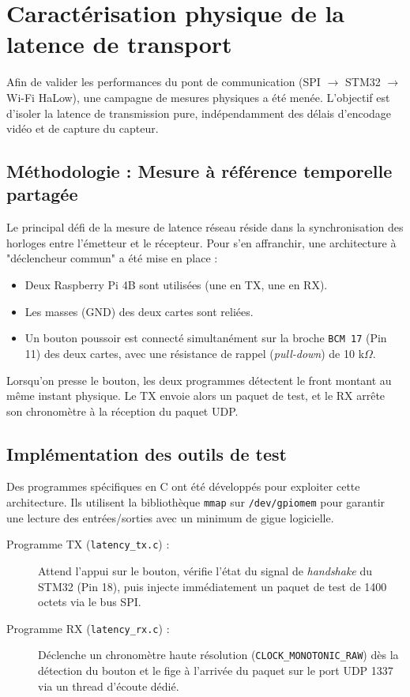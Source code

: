 \section{Caractérisation physique de la latence de transport}

Afin de valider les performances du pont de communication (SPI $\rightarrow$ STM32 $\rightarrow$ Wi-Fi HaLow), une campagne de mesures physiques a été menée. L'objectif est d'isoler la latence de transmission pure, indépendamment des délais d'encodage vidéo et de capture du capteur.

\subsection{Méthodologie : Mesure à référence temporelle partagée}
Le principal défi de la mesure de latence réseau réside dans la synchronisation des horloges entre l'émetteur et le récepteur. Pour s'en affranchir, une architecture à "déclencheur commun" a été mise en place :
\begin{itemize}
    \item Deux Raspberry Pi 4B sont utilisées (une en TX, une en RX).
    \item Les masses (GND) des deux cartes sont reliées.
    \item Un bouton poussoir est connecté simultanément sur la broche \texttt{BCM 17} (Pin 11) des deux cartes, avec une résistance de rappel (\textit{pull-down}) de 10 k$\Omega$.
\end{itemize}

Lorsqu'on presse le bouton, les deux programmes détectent le front montant au même instant physique. Le TX envoie alors un paquet de test, et le RX arrête son chronomètre à la réception du paquet UDP.

\subsection{Implémentation des outils de test}
Des programmes spécifiques en C ont été développés pour exploiter cette architecture. Ils utilisent la bibliothèque \texttt{mmap} sur \texttt{/dev/gpiomem} pour garantir une lecture des entrées/sorties avec un minimum de gigue logicielle.

\begin{description}
    \item[Programme TX (\texttt{latency\_tx.c}) :] Attend l'appui sur le bouton, vérifie l'état du signal de \textit{handshake} du STM32 (Pin 18), puis injecte immédiatement un paquet de test de 1400 octets via le bus SPI.
    \item[Programme RX (\texttt{latency\_rx.c}) :] Déclenche un chronomètre haute résolution (\texttt{CLOCK\_MONOTONIC\_RAW}) dès la détection du bouton et le fige à l'arrivée du paquet sur le port UDP 1337 via un thread d'écoute dédié.
\end{description}

